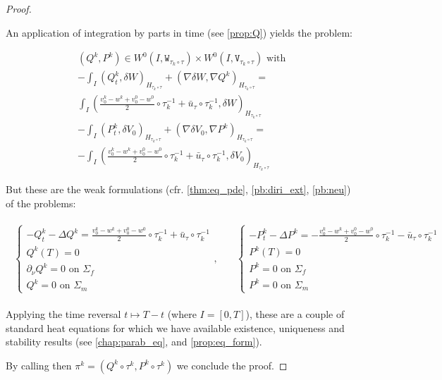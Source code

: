 \documentclass[english,a4paper,9pt,oneside]{scrbook}	%
\theoremstyle{break}
\newenvironment{mproof}[1][\proofname]{%
  \begin{proof}[#1]$ $\par\nobreak\ignorespaces
}{%
  \end{proof}
}
\renewcommand*{\proofname}{Proof}
\theoremstyle{remark}
\newcommand{\tw}[1]{\texttt{#1}}
\begin{document}
\begin{mproof}
An application of integration by parts in time (see \cref{prop:Q}) yields the problem:

\begin{align*}
(Q^k, P^k) \in W^0(I, \tw{W}_{\tau_k \circ \tau})\times W^0(I, \tw{V}_{\tau_k \circ \tau}) \text{ with }\\
-\int_I ( Q^k_t, \delta W )_{H_{\tau_k \circ \tau}}+ (\nabla \delta W, \nabla Q^k)_{H_{\tau_k \circ \tau}} =\\ \int_I \left (\frac{v_0^k-w^k+v_0^0-w^0}{2}\circ \tau_k^{-1}+\bar{u}_\tau\circ \tau_k^{-1} ,\delta W\right)_{H_{\tau_k \circ \tau}}\\
-\int_I( P^k_t, \delta V_0)_{H_{\tau_k \circ \tau}} + ( \nabla \delta V_0, \nabla P^k)_{H_{\tau_k \circ \tau}} =\\- \int_I \left (\frac{v_0^k-w^k+v_0^0-w^0}{2}\circ \tau_k^{-1}+\bar{u}_\tau\circ \tau_k^{-1} ,\delta V_0\right)_{H_{\tau_k \circ \tau}}
\end{align*}

But these are the weak formulations (cfr. \cref{thm:eq_pde}, \cref{pb:diri_ext}, \cref{pb:neu}) of the problems:

\begin{align*}
\begin{matrix}
\left\{\begin{matrix}
-Q^k_t-\Delta Q^k =\frac{v_0^k-w^k+v_0^0-w^0}{2}\circ \tau_k^{-1}+\bar{u}_\tau\circ \tau_k^{-1} \\
Q^k(T)=0\\
\partial_\nu Q^k = 0 \text{ on } \Sigma_f\\
Q^k = 0 \text{ on } \Sigma_m
\end{matrix}\right.
, \quad &
\left\{\begin{matrix}
-P^k_t-\Delta P^k =-\frac{v_0^k-w^k+v_0^0-w^0}{2}\circ \tau_k^{-1}-\bar{u}_\tau\circ \tau_k^{-1} \\
P^k(T)=0\\
P^k = 0 \text{ on } \Sigma_f\\
P^k = 0 \text{ on } \Sigma_m
\end{matrix}\right.
\end{matrix}
\end{align*}

Applying the time reversal $t\mapsto T -t$ (where $I = [0,T]$), these are a couple of standard heat equations for which we have available existence, uniqueness and stability results (see \cref{chap:parab_eq}, and \cref{prop:eq_form}).

By calling then $\pi^k = (Q^k \circ \tau^k,P^k \circ \tau^k)$ we conclude the proof.

\end{mproof}
\end{document}
